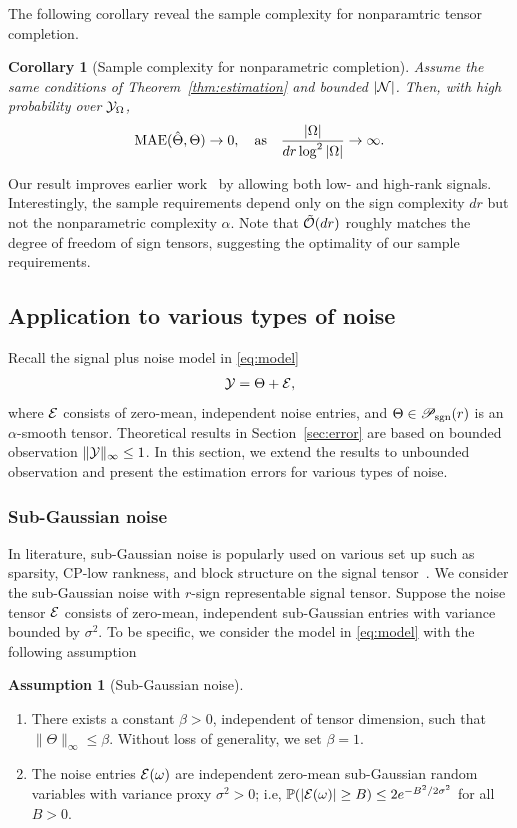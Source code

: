 \documentclass[twoside,11pt]{article}
\theoremstyle{plain}
\newtheorem{cor}{Corollary}
\theoremstyle{definition}
\newtheorem{assumption}{Assumption}
\def\caliP{\mathscr{P}_{\textup{sgn}}}
\begin{document}
The following corollary reveal the sample complexity for nonparamtric tensor completion. 
\begin{cor}[Sample complexity for nonparametric completion] Assume the same conditions of Theorem~\ref{thm:estimation} and bounded $|\mathcal{N}|$. Then, with high probability over $\mathcal{Y}_\Omega$, 
\[
\textup{MAE}(\hat \Theta, \Theta)\to 0, \quad \text{as}\quad {|\Omega|\over {dr} \log^2 |\Omega|}\to \infty.
\]
\end{cor}
Our result improves earlier work~\citep{yuan2016tensor,ghadermarzy2019near,pmlr-v119-lee20i} by allowing both low- and high-rank signals. Interestingly, the sample requirements depend only on the sign complexity $dr$ but not the nonparametric complexity $\alpha$. Note that $\tilde {\mathcal{O}}(dr)$ roughly matches the degree of freedom of sign tensors, suggesting the optimality of our sample requirements. 


\subsection{Application to various types of noise}\label{sec:subGaussian}
Recall the signal plus noise model in \eqref{eq:model}
\begin{align*}
\mathcal{Y} = \Theta+\mathcal{E},
\end{align*}
where $\mathcal{E}$ consists of zero-mean, independent noise entries, and $\Theta\in\caliP(r)$ is an $\alpha$-smooth tensor.
Theoretical results in Section~\ref{sec:error}  are based on bounded observation $\|\mathcal{Y}\|_\infty\leq 1$. In this section, we extend the results to unbounded observation and present the estimation errors for various types of noise.

\subsubsection{Sub-Gaussian noise} In literature, sub-Gaussian noise is popularly used on various set up  such as sparsity, CP-low rankness, and block structure on the signal tensor~\citep{zhang2018tensor,zhang2019optimal,wang2019multiway}. We consider the sub-Gaussian noise with $r$-sign representable signal tensor.
Suppose the noise tensor $\mathcal{E}$ consists of zero-mean, independent sub-Gaussian entries with variance bounded by $\sigma^2$. To be specific, we consider the model in \eqref{eq:model} with the following assumption

\begin{assumption}[Sub-Gaussian noise]\label{assm:subg}\text{}
\begin{enumerate}
\item There exists a constant $\beta>0$, independent of tensor dimension, such that $\|\Theta\|_\infty\leq \beta$. Without loss of generality, we set $\beta = 1$.
\item The noise entries $\mathcal{E}(\omega)$ are independent zero-mean sub-Gaussian random variables with variance proxy $\sigma^2>0$; i.e, $\mathbb{P}(|\mathcal{E}(\omega)|\geq B)\leq 2e^{-B^2/2\sigma^2}$ for all $B>0$.  
\end{enumerate}
\end{assumption}
\end{document}
